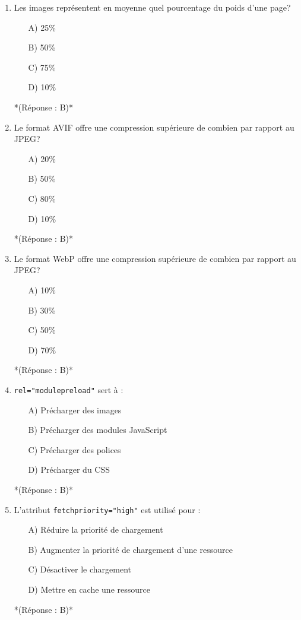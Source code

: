 \documentclass[12pt,a4paper,twoside]{report}
\begin{document}
\begin{enumerate}
\item Les images représentent en moyenne quel pourcentage du poids d'une page?
\begin{itemize}
\item[A)] 25\%
\item[B)] 50\%
\item[C)] 75\%
\item[D)] 10\%
\end{itemize}
*(Réponse : B)*

\item Le format AVIF offre une compression supérieure de combien par rapport au JPEG?
\begin{itemize}
\item[A)] 20\%
\item[B)] 50\%
\item[C)] 80\%
\item[D)] 10\%
\end{itemize}
*(Réponse : B)*

\item Le format WebP offre une compression supérieure de combien par rapport au JPEG?
\begin{itemize}
\item[A)] 10\%
\item[B)] 30\%
\item[C)] 50\%
\item[D)] 70\%
\end{itemize}
*(Réponse : B)*

\item \texttt{rel="modulepreload"} sert à :
\begin{itemize}
\item[A)] Précharger des images
\item[B)] Précharger des modules JavaScript
\item[C)] Précharger des polices
\item[D)] Précharger du CSS
\end{itemize}
*(Réponse : B)*

\item L'attribut \texttt{fetchpriority="high"} est utilisé pour :
\begin{itemize}
\item[A)] Réduire la priorité de chargement
\item[B)] Augmenter la priorité de chargement d'une ressource
\item[C)] Désactiver le chargement
\item[D)] Mettre en cache une ressource
\end{itemize}
*(Réponse : B)*


\end{enumerate}
\end{document}
